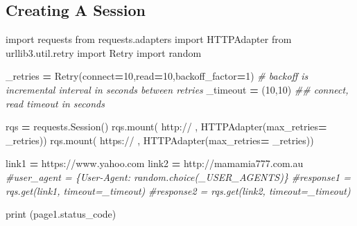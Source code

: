 \documentclass[
]{book}
\newenvironment{Shaded}{\begin{snugshade}}{\end{snugshade}}
\newcommand{\BuiltInTok}[1]{#1}
\newcommand{\CommentTok}[1]{\textcolor[rgb]{0.37,0.37,0.37}{\textit{#1}}}
\newcommand{\DecValTok}[1]{\textcolor[rgb]{0.06,0.06,0.06}{#1}}
\newcommand{\ExtensionTok}[1]{#1}
\newcommand{\ImportTok}[1]{#1}
\newcommand{\NormalTok}[1]{#1}
\newcommand{\OperatorTok}[1]{\textcolor[rgb]{0.43,0.43,0.43}{\textbf{#1}}}
\newcommand{\StringTok}[1]{\textcolor[rgb]{0.5,0.5,0.5}{#1}}
\begin{document}
\hypertarget{creating-a-session}{%
\subsection{Creating A Session}\label{creating-a-session}}

\begin{Shaded}
\begin{Highlighting}[]
\ImportTok{import}\NormalTok{ requests}
\ImportTok{from}\NormalTok{ requests.adapters }\ImportTok{import}\NormalTok{ HTTPAdapter}
\ImportTok{from}\NormalTok{ urllib3.util.retry }\ImportTok{import}\NormalTok{ Retry}
\ImportTok{import}\NormalTok{ random}


\NormalTok{\_retries }\OperatorTok{=}\NormalTok{ Retry(}\ExtensionTok{connect}\OperatorTok{=}\DecValTok{10}\NormalTok{,read}\OperatorTok{=}\DecValTok{10}\NormalTok{,backoff\_factor}\OperatorTok{=}\DecValTok{1}\NormalTok{)   }\CommentTok{\# backoff is incremental interval in seconds between retries}
\NormalTok{\_timeout }\OperatorTok{=}\NormalTok{ (}\DecValTok{10}\NormalTok{,}\DecValTok{10}\NormalTok{)  }\CommentTok{\#\# connect, read timeout in seconds}

\NormalTok{rqs }\OperatorTok{=}\NormalTok{ requests.Session()}
\NormalTok{rqs.mount( }\StringTok{\textquotesingle{}http://\textquotesingle{}}\NormalTok{ ,  HTTPAdapter(max\_retries}\OperatorTok{=}\NormalTok{ \_retries))}
\NormalTok{rqs.mount( }\StringTok{\textquotesingle{}https://\textquotesingle{}}\NormalTok{ , HTTPAdapter(max\_retries}\OperatorTok{=}\NormalTok{ \_retries))}
\end{Highlighting}
\end{Shaded}

\begin{Shaded}
\begin{Highlighting}[]
\NormalTok{link1 }\OperatorTok{=} \StringTok{\textquotesingle{}https://www.yahoo.com\textquotesingle{}}
\NormalTok{link2 }\OperatorTok{=} \StringTok{\textquotesingle{}http://mamamia777.com.au\textquotesingle{}}
\CommentTok{\#user\_agent = \{\textquotesingle{}User{-}Agent\textquotesingle{}: random.choice(\_USER\_AGENTS)\}}
\CommentTok{\#response1  = rqs.get(link1, timeout=\_timeout)}
\CommentTok{\#response2  = rqs.get(link2, timeout=\_timeout)  }
\end{Highlighting}
\end{Shaded}

\begin{Shaded}
\begin{Highlighting}[]
\BuiltInTok{print}\NormalTok{ (page1.status\_code)}
\end{Highlighting}
\end{Shaded}
\end{document}
